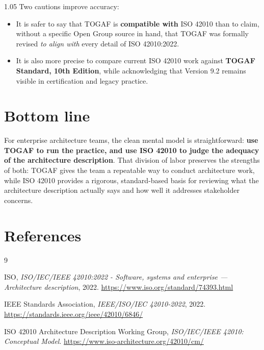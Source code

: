 \documentclass[11pt]{article}
\begin{document}
\begin{spacing}{1.05}
Two cautions improve accuracy:

\begin{itemize}[leftmargin=1.5em]
    \item It is safer to say that TOGAF is \textbf{compatible with} ISO 42010 than to claim, without a specific Open Group source in hand, that TOGAF was formally revised \emph{to align with} every detail of ISO 42010:2022.
    \item It is also more precise to compare current ISO 42010 work against \textbf{TOGAF Standard, 10th Edition}, while acknowledging that Version 9.2 remains visible in certification and legacy practice.\cite{togaf10,togafcert}
\end{itemize}

\section{Bottom line}

For enterprise architecture teams, the clean mental model is straightforward: \textbf{use TOGAF to run the practice, and use ISO 42010 to judge the adequacy of the architecture description}. That division of labor preserves the strengths of both: TOGAF gives the team a repeatable way to conduct architecture work, while ISO 42010 provides a rigorous, standard-based basis for reviewing what the architecture description actually says and how well it addresses stakeholder concerns.\cite{iso42010,togaf,togafadm,conceptualmodel}

\section*{References}
\begin{thebibliography}{9}

ISO,
\emph{ISO/IEC/IEEE 42010:2022 - Software, systems and enterprise --- Architecture description},
2022.
\newline\url{https://www.iso.org/standard/74393.html}

IEEE Standards Association,
\emph{IEEE/ISO/IEC 42010-2022},
2022.
\newline\url{https://standards.ieee.org/ieee/42010/6846/}

ISO 42010 Architecture Description Working Group,
\emph{ISO/IEC/IEEE 42010: Conceptual Model}.
\newline\url{https://www.iso-architecture.org/42010/cm/}


\end{thebibliography}
\end{spacing}
\end{document}
